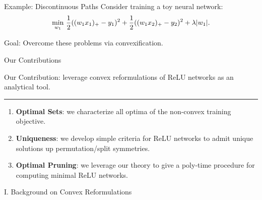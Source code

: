 \documentclass[usenames,dvipsnames,mathserif,notheorems]{beamer}
\newcommand{\horizontalrule}{
	{
			\vspace{-0.5em}
			\center \rule{\textwidth}{0.1em}
			\vspace{-0.2em}
		}
}
\newcommand{\good}[1]{\textcolor{good}{#1}}
\begin{document}
\begin{frame}{Example: Discontinuous Paths}
	Consider training a toy neural network:
	\[
		\min_{w_1} \, \frac 1 2 ((w_1 x_1)_+ - y_1)^2 + \frac 1 2 ((w_1 x_2)_+ - y_2)^2 + \lambda |w_1|.
	\]

	\begin{center}
		
	\end{center}

	\pause

	\begin{center}
		\Large
		\good{Goal}: Overcome these problems via convexification.
	\end{center}

\end{frame}

\begin{frame}{Our Contributions}

	{
		\large \good{Our Contribution}: leverage convex reformulations
		of ReLU networks \citep{pilanci2020convex} as an analytical tool.
	}

	\pause
	\vspace{0.5em}
	\horizontalrule
	\vspace{0.5em}

	\begin{enumerate}
		\item \textbf{Optimal Sets}: we characterize all optima of the
		      non-convex training objective.\pause
		      \vspace{0.5em}

		\item \textbf{Uniqueness}: we develop simple criteria for ReLU networks
		      to admit unique solutions up permutation/split symmetries. \pause
		      \vspace{0.5em}

		\item \textbf{Optimal Pruning}: we leverage our theory to give a
		      poly-time procedure for computing minimal ReLU networks.
	\end{enumerate}

\end{frame}


\begin{frame}{}
	\begin{center}
		\huge I. Background on Convex Reformulations
	\end{center}
\end{frame}
\end{document}
